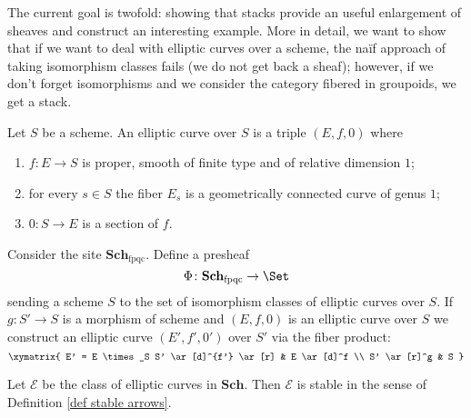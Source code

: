 The current goal is twofold: showing that stacks provide an useful enlargement of sheaves and construct an interesting example. More in detail, we want to show that if we want to deal with elliptic curves over a scheme, the na{\"i}f approach of taking isomorphism classes fails (we do not get back a sheaf); however, if we don't forget isomorphisms and we consider the category fibered in groupoids, we get a stack.

\begin{defin}
Let $S$ be a scheme. An elliptic curve over $S$ is a triple $(E,f,0)$ where
\begin{enumerate}
\item $f \colon E \to S$ is proper, smooth of finite type and of relative dimension $1$;
\item for every $s \in S$ the fiber $E_s$ is a geometrically connected curve of genus $1$;
\item $0 \colon S \to E$ is a section of $f$.
\end{enumerate}
\end{defin}

Consider the site $\mathbf{Sch}_{\mathrm{fpqc}}$. Define a presheaf
\[
\Phi \colon \mathbf{Sch}_{\mathrm{fpqc}} \to \Set
\]
sending a scheme $S$ to the set of isomorphism classes of elliptic curves over $S$. If $g \colon S' \to S$ is a morphism of scheme and $(E,f,0)$ is an elliptic curve over $S$ we construct an elliptic curve $(E',f',0')$ over $S'$ via the fiber product:
\[
\xymatrix{
E' = E \times_S S' \ar[d]^{f'} \ar[r] & E \ar[d]^f \\ S' \ar[r]^g & S
}
\]

\begin{lemma} \label{lemma elliptic fibered}
Let $\mathcal E$ be the class of elliptic curves in $\mathbf{Sch}$. Then $\mathcal E$ is stable in the sense of Definition \ref{def stable arrows}.
\end{lemma}

